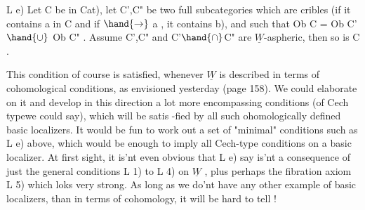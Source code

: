 L e)  Let C be in \over{(}{(}Cat), let C',C" be two full subcategories which
are cribles\hand{$*$} (if it contains a in C and if  $\hand{\to}$ a , it contains
b), and such that Ob C = Ob C' $\hand{\cup}$ Ob C" . Assume C',C" and
C'$\hand{\cap}$C" are $\underline{W}$-aspheric, then so is C .

This condition of course is satisfied, whenever $\underline{W}$ is described in
terms of cohomological conditions, as envisioned yesterday (page 158).
We could elaborate on it and develop in this direction a lot more
encompassing conditions (of \hand{\v{}}Cech typewe could say), which will be satis
-fied by all such ohomologically defined basic localizers. It would be
fun to work out a set of "minimal" conditions such as L e) above, which
would be enough to imply all \hand{\v{}}Cech-type conditions on a basic localizer.
At first sight, it is'nt even obvious that L e) say is'nt a consequence
\margin{$\times$}
of just the general conditions L 1) to L 4) on $\underline{W}$ , plus perhaps the
fibration axiom L 5) which loks very strong. As long as we do'nt have
any other example of basic localizers, than in terms of cohomology, it
will be hard to tell !

